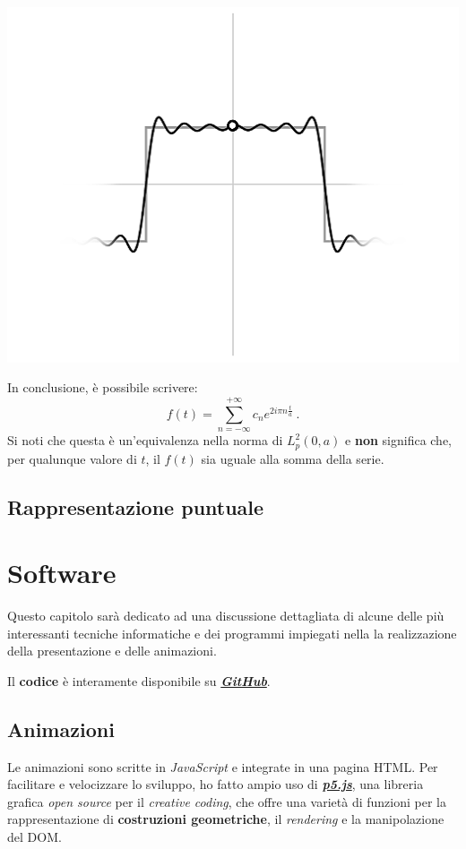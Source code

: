 \documentclass[
]{book}
\begin{document}
\begin{center}\includegraphics[width=0.5\linewidth]{_images/appr} \end{center}

In conclusione, è possibile scrivere:
\[ f(t) = \sum_{n= - \infty}^{+ \infty} c_n e^{2 i \pi n \textstyle \frac {t}{a}} \ .\]
Si noti che questa è un'equivalenza nella norma di \(L_{p}^{2}(0,a)\) e \textbf{non} significa che, per qualunque valore di \(t\), il \(f(t)\) sia uguale alla somma della serie.

\hypertarget{rapprpunt}{%
\section{Rappresentazione puntuale}\label{rapprpunt}}

\hypertarget{software}{%
\chapter{Software}\label{software}}

Questo capitolo sarà dedicato ad una discussione dettagliata di alcune delle più interessanti tecniche informatiche e dei programmi impiegati nella la realizzazione della presentazione e delle animazioni.

Il \textbf{codice} è interamente disponibile su \href{https://github.com/Bradwave/thesis}{\emph{\textbf{GitHub}}}.

\hypertarget{softan}{%
\section{Animazioni}\label{softan}}

Le animazioni sono scritte in \emph{JavaScript} e integrate in una pagina HTML. Per facilitare e velocizzare lo sviluppo, ho fatto ampio uso di \href{https://p5js.org/}{\emph{\textbf{p5.js}}}, una libreria grafica \emph{open source} per il \emph{creative coding}, che offre una varietà di funzioni per la rappresentazione di \textbf{costruzioni geometriche}, il \emph{rendering} e la manipolazione del DOM.
\end{document}
